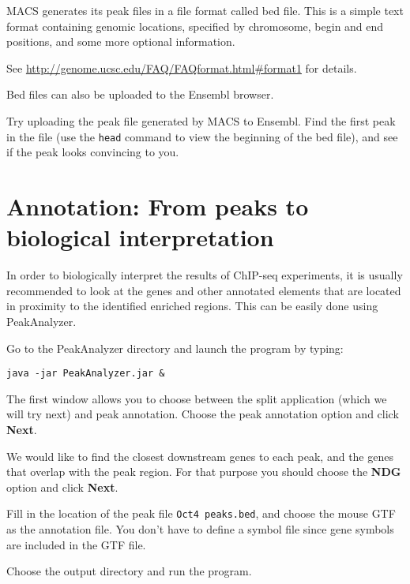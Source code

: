 \begin{note}
MACS generates its peak files in a file format called bed file. This is a simple
text format containing genomic locations, specified by chromosome, begin and end
positions, and some more optional information.

See \url{http://genome.ucsc.edu/FAQ/FAQformat.html#format1} for details.

Bed files can also be uploaded to the Ensembl browser.
\end{note}

\begin{advanced}
Try uploading the peak file generated by MACS to Ensembl. Find the first peak in
the file (use the \texttt{head} command to view the beginning of the bed file), and see
if the peak looks convincing to you.
\end{advanced}


\section{Annotation: From peaks to biological interpretation}

\begin{information}
In order to biologically interpret the results of ChIP-seq experiments, it is
usually recommended to look at the genes and other annotated elements that are
located in proximity to the identified enriched regions. This can be easily done
using PeakAnalyzer.
\end{information}

\begin{steps}
Go to the PeakAnalyzer directory and launch the program by typing:
\begin{lstlisting}
java -jar PeakAnalyzer.jar &
\end{lstlisting}

The first window allows you to choose between the split application (which we
will try next) and peak annotation. Choose the peak annotation option and click
\textbf{Next}.

We would like to find the closest downstream genes to each peak, and the genes
that overlap with the peak region. For that purpose you should choose the
\textbf{NDG} option and click \textbf{Next}.

Fill in the location of the peak file \texttt{Oct4 peaks.bed}, and choose the mouse GTF
as the annotation file. You don't have to define a symbol file since gene
symbols are included in the GTF file.

Choose the output directory and run the program.
\end{steps}


